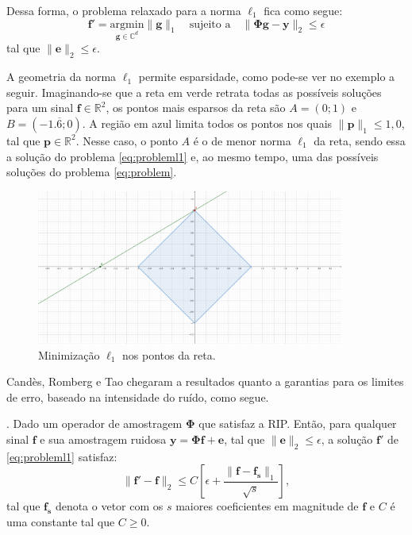 \documentclass[cic,tc]{iiufrgs}
\renewcommand{\vec}[1]{\bm{#1}}
\begin{document}
Dessa forma, o problema relaxado para a norma $\ell_1$ fica como segue:
\begin{equation}
    \label{eq:probleml1}
    \vec{f'} = \underset{\vec{g} \in \mathbb{C}^d}{\text{argmin}} \lVert \vec{g} \rVert_1 \hspace{1em} \text{sujeito a} \hspace{1em}
    \lVert \mathbf{\Phi} \vec{g} - \vec{y} \rVert_2 \le \epsilon
\end{equation}
tal que $\lVert \vec{e} \rVert_2 \le \epsilon $.

A geometria da norma $\ell_1$ permite esparsidade, como pode-se ver no exemplo a seguir. Imaginando-se 
que a reta em verde retrata todas as possíveis soluções para um sinal $\vec{f} \in \mathbb{R}^2$, os pontos
mais esparsos da reta são $A=(0;1)$ e $B=(-1.\overline{6};0)$. A região em azul limita todos os pontos 
nos quais $\lVert\vec{p}\rVert_1 \le 1,0$, tal que $\vec{p} \in \mathbb{R}^2$. Nesse caso, o ponto $A$ é o 
de menor norma $\ell_1$ da reta, sendo essa a solução do problema \eqref{eq:probleml1} e, ao mesmo tempo, 
uma das possíveis soluções do problema \eqref{eq:problem}.
\begin{figure}[h]
    \caption{Minimização $\ell_1$ nos pontos da reta.}
    \begin{center}
        \includegraphics[width=0.9\textwidth]{img/l1ball}
    \end{center}
    \label{fig:l1ball}
\end{figure}

Candès, Romberg e Tao chegaram a resultados quanto a garantias para os limites de erro, baseado na 
intensidade do ruído, como segue.
\begin{teorema}
    \cite{candes2006stable}. 
    Dado um operador de amostragem $\mathbf{\Phi}$ que satisfaz a RIP.
    Então, para qualquer sinal $\vec{f}$ e sua amostragem ruidosa $\vec{y} = \mathbf{\Phi}\vec{f} + \vec{e}$, 
    tal que $\lVert \vec{e} \rVert_2 \le \epsilon$, a solução $\vec{f}'$ de \eqref{eq:probleml1} satisfaz:
    \begin{equation*}
        \lVert \vec{f}' - \vec{f} \rVert_2 \le C \left[ \epsilon + \frac{\lVert \vec{f} - \vec{f_s} \rVert_1}{\sqrt{s}} \right],
    \end{equation*}
    tal que $\vec{f_s}$ denota o vetor com os $s$ maiores coeficientes em magnitude de $\vec{f}$ e $C$ é uma
    constante tal que $C \ge 0$.
\end{teorema}
\end{document}
